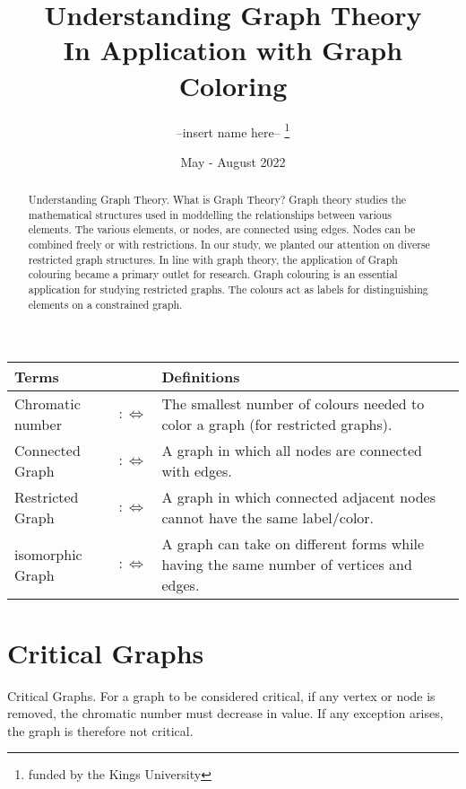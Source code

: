 \documentclass[12pt, letterpaper, twoside]{article}
\title{%
  Understanding Graph Theory \\
  
  \large In Application with Graph Coloring}
\author{ --insert name here-- \thanks{funded by the Kings University}}
\date{ May - August 2022 }
\begin{document}
\begin{titlepage}
\maketitle
\end{titlepage}

\begin{abstract}
Understanding Graph Theory. What is Graph Theory? 
Graph theory studies the mathematical structures used in moddelling the relationships between various elements.
The various elements, or nodes, are connected using edges. 
Nodes can be combined freely or with restrictions. In our study, we planted our attention on diverse restricted graph structures.
In line with graph theory, the application of Graph colouring became a primary outlet for research. Graph colouring is an essential application for studying restricted graphs. 
The colours act as labels for distinguishing elements on a constrained graph.
\end{abstract}

\begin{tabular}{l c p{}}
\toprule
Terms           &                  & Definitions \\
\midrule
Chromatic number &$:\Leftrightarrow$& The smallest number of colours needed to color a graph (for restricted graphs).\\
Connected Graph  &$:\Leftrightarrow$& A graph in which all nodes are connected with edges. \\
Restricted Graph  &$:\Leftrightarrow$& A graph in which connected adjacent nodes cannot have the same label/color.\\
isomorphic Graph  &$:\Leftrightarrow$& A graph can take on different forms while having the same number of vertices and edges.\\

\bottomrule
\end{tabular}


\clearpage


\section{Critical Graphs}
Critical Graphs. For a graph to be considered critical, if any vertex or node is removed, the chromatic number must decrease in value. If any exception arises, the graph is therefore not critical.
\end{document}
